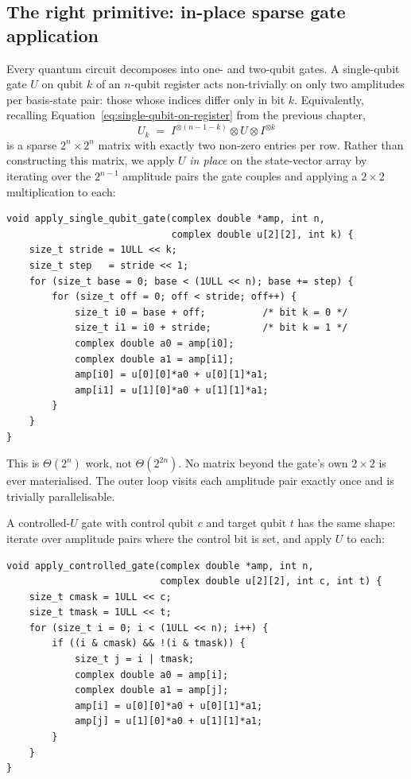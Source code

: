 \subsection{The right primitive: in-place sparse gate application}

Every quantum circuit decomposes into one- and two-qubit gates. A single-qubit gate $U$ on qubit $k$ of an $n$-qubit register acts non-trivially on only two amplitudes per basis-state pair: those whose indices differ only in bit $k$. Equivalently, recalling Equation~\ref{eq:single-qubit-on-register} from the previous chapter,
\begin{equation}
U_k \;=\; I^{\otimes(n-1-k)} \otimes U \otimes I^{\otimes k}
\end{equation}
is a sparse $2^n \times 2^n$ matrix with exactly two non-zero entries per row. Rather than constructing this matrix, we apply $U$ \emph{in place} on the state-vector array by iterating over the $2^{n-1}$ amplitude pairs the gate couples and applying a $2\times 2$ multiplication to each:

\begin{lstlisting}[caption={Single-qubit gate applied in place on the state vector.}]
void apply_single_qubit_gate(complex double *amp, int n,
                             complex double u[2][2], int k) {
    size_t stride = 1ULL << k;
    size_t step   = stride << 1;
    for (size_t base = 0; base < (1ULL << n); base += step) {
        for (size_t off = 0; off < stride; off++) {
            size_t i0 = base + off;          /* bit k = 0 */
            size_t i1 = i0 + stride;         /* bit k = 1 */
            complex double a0 = amp[i0];
            complex double a1 = amp[i1];
            amp[i0] = u[0][0]*a0 + u[0][1]*a1;
            amp[i1] = u[1][0]*a0 + u[1][1]*a1;
        }
    }
}
\end{lstlisting}

This is $\Theta(2^n)$ work, not $\Theta(2^{2n})$. No matrix beyond the gate's own $2\times 2$ is ever materialised. The outer loop visits each amplitude pair exactly once and is trivially parallelisable.

A controlled-$U$ gate with control qubit $c$ and target qubit $t$ has the same shape: iterate over amplitude pairs where the control bit is set, and apply $U$ to each:

\begin{lstlisting}[caption={Controlled single-qubit gate.}]
void apply_controlled_gate(complex double *amp, int n,
                           complex double u[2][2], int c, int t) {
    size_t cmask = 1ULL << c;
    size_t tmask = 1ULL << t;
    for (size_t i = 0; i < (1ULL << n); i++) {
        if ((i & cmask) && !(i & tmask)) {
            size_t j = i | tmask;
            complex double a0 = amp[i];
            complex double a1 = amp[j];
            amp[i] = u[0][0]*a0 + u[0][1]*a1;
            amp[j] = u[1][0]*a0 + u[1][1]*a1;
        }
    }
}
\end{lstlisting}

